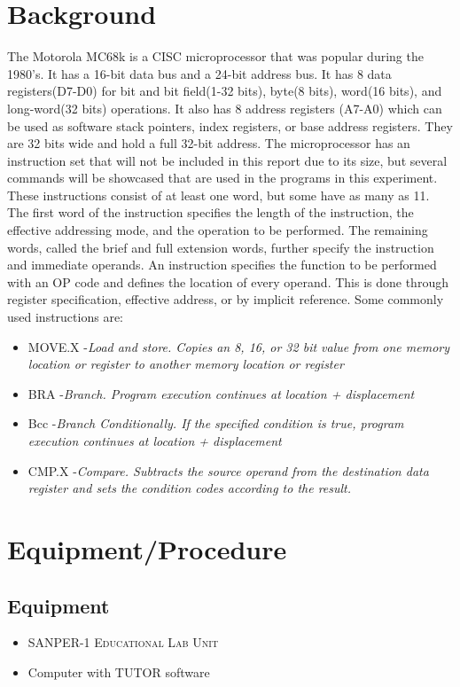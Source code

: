 \documentclass[12pt, twocolumn]{article}
\begin{document}
\section{Background}
The Motorola MC68k is a CISC microprocessor that was popular during the 1980's. It has a 16-bit data bus and a 24-bit address bus. It has 8 data registers(D7-D0) for bit and bit field(1-32 bits), byte(8 bits), word(16 bits), and long-word(32 bits) operations. It also has 8 address registers (A7-A0) which can be used as software stack pointers, index registers, or base address registers. They are 32 bits wide and hold a full 32-bit address\cite{m68k}. The microprocessor has an instruction set that will not be included in this report due to its size, but several commands will be showcased that are used in the programs in this experiment. These instructions consist of at least one word, but some have as many as 11. The first word of the instruction specifies the length of the instruction, the effective addressing mode, and the operation to be performed. The remaining words, called the brief and full extension words, further specify the instruction and immediate operands. An instruction specifies the function to be performed with an OP code and defines the location of every operand. This is done through register specification, effective address, or by implicit reference. Some commonly used instructions are:
\begin{itemize}
	\item MOVE.X -\emph{Load and store. Copies an 8, 16, or 32 bit value from one memory location or register to another memory location or register}
	\item BRA -\emph{Branch. Program execution continues at location + displacement}
	\item Bcc -\emph{Branch Conditionally. If the specified condition is true, program execution continues at location + displacement}
	\item CMP.X -\emph{Compare. Subtracts the source operand from the destination data register and sets the condition codes according to the result.}
\end{itemize}
\section{Equipment/Procedure}
\subsection{Equipment}
\begin{itemize}
	\item \textsc{SANPER-1 Educational Lab Unit}
	\item Computer with TUTOR software
\end{itemize}
\end{document}
